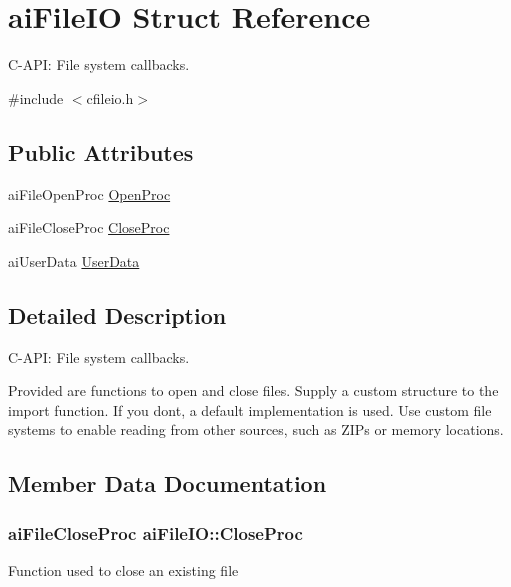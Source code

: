 \hypertarget{structai_file_i_o}{}\section{ai\+File\+IO Struct Reference}
\label{structai_file_i_o}


C-\/\+A\+PI\+: File system callbacks.  




{\ttfamily \#include $<$cfileio.\+h$>$}

\subsection*{Public Attributes}
\begin{DoxyCompactItemize}
\item 
ai\+File\+Open\+Proc \hyperlink{structai_file_i_o_a819d9c7823039294125068d06949a6df}{Open\+Proc}
\item 
ai\+File\+Close\+Proc \hyperlink{structai_file_i_o_a7ec702672712b5a02dc49cb17f980a14}{Close\+Proc}
\item 
ai\+User\+Data \hyperlink{structai_file_i_o_a9c62b7f3d70fbb2f41e33ad0b9933139}{User\+Data}
\end{DoxyCompactItemize}


\subsection{Detailed Description}
C-\/\+A\+PI\+: File system callbacks. 

Provided are functions to open and close files. Supply a custom structure to the import function. If you don\textquotesingle{}t, a default implementation is used. Use custom file systems to enable reading from other sources, such as Z\+I\+Ps or memory locations. 

\subsection{Member Data Documentation}
\subsubsection[{\texorpdfstring{Close\+Proc}{CloseProc}}]{\setlength{\rightskip}{0pt plus 5cm}ai\+File\+Close\+Proc ai\+File\+I\+O\+::\+Close\+Proc}\hypertarget{structai_file_i_o_a7ec702672712b5a02dc49cb17f980a14}{}\label{structai_file_i_o_a7ec702672712b5a02dc49cb17f980a14}
Function used to close an existing file 
